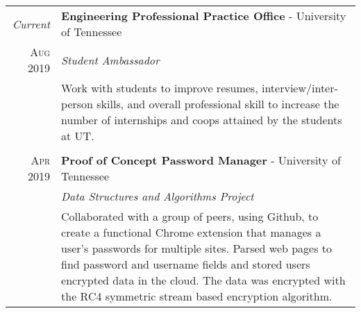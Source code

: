 \documentclass[a4paper,11pt]{article}
\begin{document}
\begin{tabularx}{\textwidth}{r|X}

   \emph{Current} & \textbf{Engineering Professional Practice Office} \-- University of Tennessee\\
   \textsc{Aug 2019} & \emph{Student Ambassador}\\
   & \small{Work with students to improve resumes, interview/inter-person skills, and overall professional skill to increase the number of internships and coops attained by the students at UT\@.
   }\\

   \multicolumn{2}{c}{} \\

   \textsc{Apr 2019} & \textbf{Proof of Concept Password Manager} \-- University of Tennessee\\
   & \emph{Data Structures and Algorithms Project}\\
   & \small{Collaborated with a group of peers, using Github, to create a functional Chrome extension that manages a user's passwords for multiple sites.
            Parsed web pages to find password and username fields and stored users encrypted data in the cloud.
            The data was encrypted with the RC4 symmetric stream based encryption algorithm.
   }\\
\end{tabularx}

\end{document}
